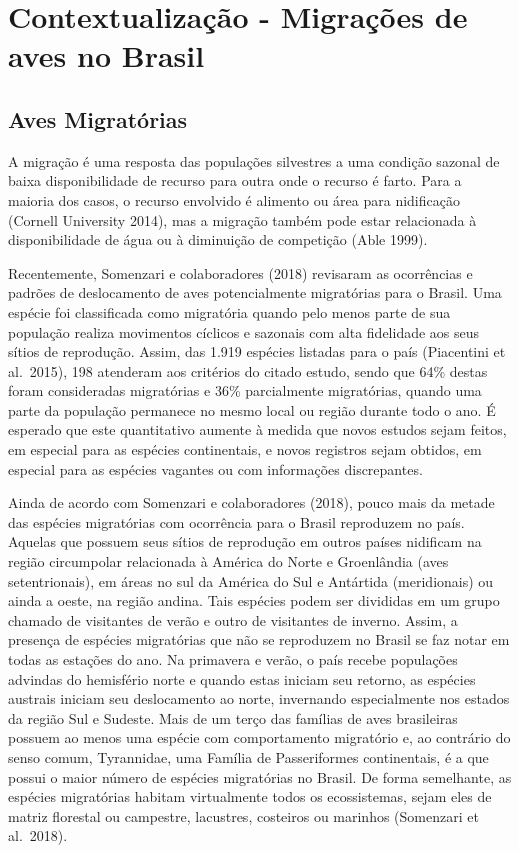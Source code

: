 \documentclass[
]{scrbook}
\begin{document}
\hypertarget{contextualizacao}{%
\section{Contextualização - Migrações de aves no Brasil}\label{contextualizacao}}

\hypertarget{aves-migratorias}{%
\subsection{Aves Migratórias}\label{aves-migratorias}}

A migração é uma resposta das populações silvestres a uma condição sazonal de baixa disponibilidade de recurso para outra onde o recurso é farto. Para a maioria dos casos, o recurso envolvido é alimento ou área para nidificação (Cornell University 2014), mas a migração também pode estar relacionada à disponibilidade de água ou à diminuição de competição (Able 1999).

Recentemente, Somenzari e colaboradores (2018) revisaram as ocorrências e padrões de deslocamento de aves potencialmente migratórias para o Brasil. Uma espécie foi classificada como migratória quando pelo menos parte de sua população realiza movimentos cíclicos e sazonais com alta fidelidade aos seus sítios de reprodução. Assim, das 1.919 espécies listadas para o país (Piacentini et al.~2015), 198 atenderam aos critérios do citado estudo, sendo que 64\% destas foram consideradas migratórias e 36\% parcialmente migratórias, quando uma parte da população permanece no mesmo local ou região durante todo o ano. É esperado que este quantitativo aumente à medida que novos estudos sejam feitos, em especial para as espécies continentais, e novos registros sejam obtidos, em especial para as espécies vagantes ou com informações discrepantes.

Ainda de acordo com Somenzari e colaboradores (2018), pouco mais da metade das espécies migratórias com ocorrência para o Brasil reproduzem no país. Aquelas que possuem seus sítios de reprodução em outros países nidificam na região circumpolar relacionada à América do Norte e Groenlândia (aves setentrionais), em áreas no sul da América do Sul e Antártida (meridionais) ou ainda a oeste, na região andina. Tais espécies podem ser divididas em um grupo chamado de visitantes de verão e outro de visitantes de inverno. Assim, a presença de espécies migratórias que não se reproduzem no Brasil se faz notar em todas as estações do ano. Na primavera e verão, o país recebe populações advindas do hemisfério norte e quando estas iniciam seu retorno, as espécies austrais iniciam seu deslocamento ao norte, invernando especialmente nos estados da região Sul e Sudeste. Mais de um terço das famílias de aves brasileiras possuem ao menos uma espécie com comportamento migratório e, ao contrário do senso comum, Tyrannidae, uma Família de Passeriformes continentais, é a que possui o maior número de espécies migratórias no Brasil. De forma semelhante, as espécies migratórias habitam virtualmente todos os ecossistemas, sejam eles de matriz florestal ou campestre, lacustres, costeiros ou marinhos (Somenzari et al.~2018).
\end{document}

